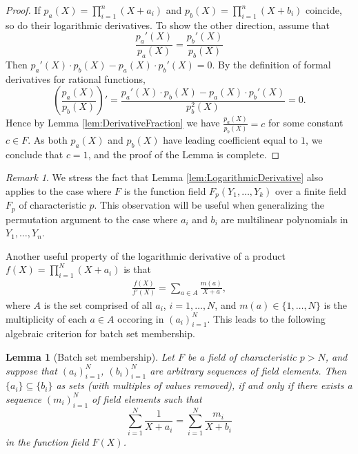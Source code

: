 \documentclass[11pt]{article}
\newtheorem{lem}[]{Lemma}
\theoremstyle{definition}
\theoremstyle{remark}
\newtheorem{rem}[thm]{Remark}
\begin{document}
\begin{proof}
If  $p_a(X) = \prod_{i=1}^n \left(X + a_i\right)$ and $p_b(X) = \prod_{i=1}^n \left(X + b_i\right)$
coincide, so do their logarithmic derivatives.
To show the other direction, assume that 
\[
\frac{p_a'(X)}{p_a(X)}  = \frac{p_b'(X)}{p_b(X)}
\]
Then $p_a'(X)\cdot p_b(X) - p_a(X)\cdot  p_b'(X) = 0$. 
By the definition of formal derivatives for rational functions,  
\[
\left(\frac{p_a(X)}{p_b(X)}\right)'  = \frac{p_a'(X)\cdot p_b(X) - p_a(X)\cdot  p_b'(X)} {p_b^2(X)} = 0.
\]
Hence by Lemma \ref{lem:DerivativeFraction} we have $\frac{p_a(X)}{p_b(X)} = c$ for some constant  $c \in F$.
As both $p_a(X)$ and $p_b(X)$ have leading coefficient equal to $1$, we conclude that $c =1$, and the proof of the Lemma is complete.
\end{proof}
\begin{rem}
\label{rem:LogarithmicDerivativeFunctionField}
We stress the fact that Lemma \ref{lem:LogarithmicDerivative} also applies to the case where $F$  is the function field $F_p(Y_1,\ldots, Y_k)$ over a finite field $F_p$ of characteristic $p$.
This observation will be useful when generalizing the permutation argument to the case where $a_i$ and $b_i$ are multilinear polynomials in $Y_1, \ldots, Y_n$.
\end{rem}

Another useful property of the logarithmic derivative of a product $f(X)=\prod_{i=1}^N (X + a_i)$ is that
\begin{align*}
\frac{f(X)}{f'(X)} = \sum_{a\in A} \frac{m(a)}{X + a},
\end{align*}
where $A$ is the set comprised of all $a_i$, $i=1,\ldots, N$,  and $m(a)\in \{1,\ldots, N\}$ is the multiplicity of each $a\in A$ occoring in $(a_i)_{i=1}^N$.
This leads to the following algebraic criterion for batch set membership.
\begin{lem}[Batch set membership]
\label{lem:batchsetmembership}
Let $F$ be a field of characteristic $p>N$, and suppose that $(a_i)_{i=1}^N$, $(b_i)_{i=1}^N$ are arbitrary sequences of field elements.
Then $\{a_i \}\subseteq \{b_i\}$ as sets (with multiples of values removed), if and only if there exists a sequence $(m_i)_{i=1}^N$ of field elements such that
\begin{equation}
\label{e:fracs}
\sum_{i=1}^N \frac{1}{X + a_i} = \sum_{i=1}^N \frac{m_i}{X + b_i}  
\end{equation}
in the function field $F(X)$.
\end{lem}
\end{document}
